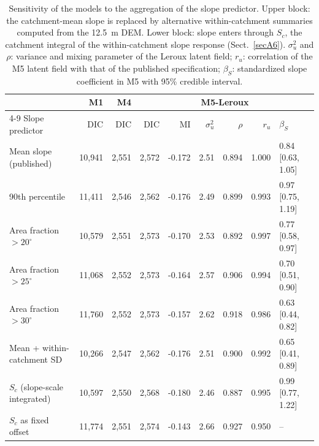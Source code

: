 \begin{table}[h]
\caption{Sensitivity of the models to the aggregation of the slope predictor. Upper block: the catchment-mean slope is replaced by alternative within-catchment summaries computed from the 12.5~m DEM. Lower block: slope enters through $S_c$, the catchment integral of the within-catchment slope response (Sect.~\ref{secA6}). $\sigma^2_u$ and $\rho$: variance and mixing parameter of the Leroux latent field; $r_u$: correlation of the M5 latent field with that of the published specification; $\beta_S$: standardized slope coefficient in M5 with 95\% credible interval.}\label{tabA6}
\footnotesize
\begin{tabular}{@{}lrrrrrrrl@{}}
\toprule
 & M1 & M4 & \multicolumn{6}{c}{M5-Leroux} \\
\cmidrule(lr){4-9}
Slope predictor & DIC & DIC & DIC & MI & $\sigma^2_u$ & $\rho$ & $r_u$ & $\beta_S$ \\
\midrule
Mean slope (published) & 10,941 & 2,551 & 2,572 & -0.172 & 2.51 & 0.894 & 1.000 & 0.84 [0.63, 1.05] \\
90th percentile & 11,411 & 2,546 & 2,562 & -0.176 & 2.49 & 0.899 & 0.993 & 0.97 [0.75, 1.19] \\
Area fraction $>20^{\circ}$ & 10,579 & 2,551 & 2,573 & -0.170 & 2.53 & 0.892 & 0.997 & 0.77 [0.58, 0.97] \\
Area fraction $>25^{\circ}$ & 11,068 & 2,552 & 2,573 & -0.164 & 2.57 & 0.906 & 0.994 & 0.70 [0.51, 0.90] \\
Area fraction $>30^{\circ}$ & 11,760 & 2,552 & 2,573 & -0.157 & 2.62 & 0.918 & 0.986 & 0.63 [0.44, 0.82] \\
Mean + within-catchment SD & 10,266 & 2,547 & 2,562 & -0.176 & 2.51 & 0.900 & 0.992 & 0.65 [0.41, 0.89] \\
\midrule
$S_c$ (slope-scale integrated) & 10,597 & 2,550 & 2,568 & -0.180 & 2.46 & 0.887 & 0.995 & 0.99 [0.77, 1.22] \\
$S_c$ as fixed offset & 11,774 & 2,551 & 2,574 & -0.143 & 2.66 & 0.927 & 0.950 & -- \\
\bottomrule
\end{tabular}
\end{table}
